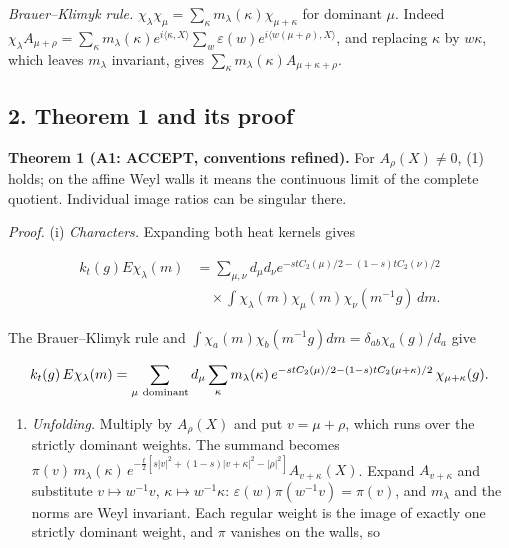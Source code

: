 \documentclass[11pt,a4paper]{article}
\newcommand{\tightlist}{\setlength{\itemsep}{0pt}\setlength{\parskip}{0pt}}
\begin{document}
\emph{Brauer--Klimyk rule.}
\(\chi_\lambda\chi_\mu=\sum_\kappa m_\lambda(\kappa)\chi_{\mu+\kappa}\)
for dominant \(\mu\). Indeed
\(\chi_\lambda A_{\mu+\rho}=\sum_\kappa m_\lambda(\kappa)e^{i\langle\kappa,X\rangle}\sum_w\varepsilon(w)e^{i\langle w(\mu+\rho),X\rangle}\),
and replacing \(\kappa\) by \(w\kappa\), which leaves \(m_\lambda\)
invariant, gives \(\sum_\kappa m_\lambda(\kappa)A_{\mu+\kappa+\rho}\).

\hypertarget{theorem-1-and-its-proof}{%
\subsection{2. Theorem 1 and its proof}\label{theorem-1-and-its-proof}}

\textbf{Theorem 1 (A1: ACCEPT, conventions refined).} For
\(A_\rho(X)\ne0\), (1) holds; on the affine Weyl walls it means the
continuous limit of the complete quotient. Individual image ratios can
be singular there.

\emph{Proof.} (i) \emph{Characters.} Expanding both heat kernels gives

\[\begin{aligned}
k_t(g)E\chi_\lambda(m)
&=\sum_{\mu,\nu}d_\mu d_\nu
e^{-stC_2(\mu)/2-(1-s)tC_2(\nu)/2}\\
&\quad\times\int\chi_\lambda(m)\chi_\mu(m)\chi_\nu(m^{-1}g)\,dm.
\end{aligned}\]

The Brauer--Klimyk rule and
\(\int\chi_a(m)\chi_b(m^{-1}g)dm=\delta_{ab}\chi_a(g)/d_a\) give

\[k_t(g)\,E\chi_\lambda(m)=\sum_{\mu\ {\rm dominant}}d_\mu\sum_\kappa m_\lambda(\kappa)\,
e^{-stC_2(\mu)/2-(1-s)tC_2(\mu+\kappa)/2}\,\chi_{\mu+\kappa}(g).\]

\begin{enumerate}
\def\labelenumi{(\roman{enumi})}
\setcounter{enumi}{1}
\tightlist
\item
  \emph{Unfolding.} Multiply by \(A_\rho(X)\) and put \(v=\mu+\rho\),
  which runs over the strictly dominant weights. The summand becomes
  \(\pi(v)\,m_\lambda(\kappa)\,e^{-\frac t2[s|v|^2+(1-s)|v+\kappa|^2-|\rho|^2]}A_{v+\kappa}(X)\).
  Expand \(A_{v+\kappa}\) and substitute \(v\mapsto w^{-1}v\),
  \(\kappa\mapsto w^{-1}\kappa\): \(\varepsilon(w)\pi(w^{-1}v)=\pi(v)\),
  and \(m_\lambda\) and the norms are Weyl invariant. Each regular
  weight is the image of exactly one strictly dominant weight, and
  \(\pi\) vanishes on the walls, so
\end{enumerate}
\end{document}
